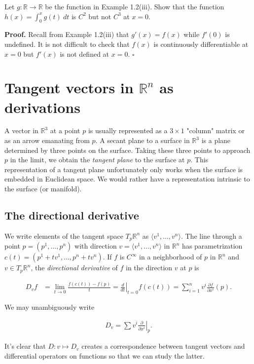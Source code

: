 \documentclass[a4paper]{article}
\newcommand{\R}{\mathbb{R}}
\begin{document}
Let $g : \R \to \R$ be the function in Example 1.2(iii). Show that the function $h(x) = \int_0^x g(t)\ dt$ is $C^2$ but not $C^3$ at $x = 0$.

\textbf{Proof.} Recall from Example 1.2(iii) that $g'(x) = f(x)$ while $f'(0)$ is undefined. It is not difficult to check that $f(x)$ is continuously differentiable at $x = 0$ but $f'(x)$ is not defined at $x = 0$. $\square$

\section{Tangent vectors in $\R^n$ as derivations}

A vector in $\R^3$ at a point $p$ is usually represented as a $3\times1$ "column" matrix or as an arrow emanating from $p$. A secant plane to a surface in $\R^3$ is a plane determined by three points on the surface. Taking these three points to approach $p$ in the limit, we obtain the \emph{tangent plane} to the surface at $p$. This representation of a tangent plane unfortunately only works when the surface is embedded in Euclidean space. We would rather have a representation intrinsic to the surface (or manifold).

\subsection{The directional derivative}

We write elements of the tangent space $T_p\R^n$ as $\langle v^1, \ldots, v^n \rangle$. The line through a point $p = (p^1, \ldots, p^n)$ with direction $v = \langle v^1, \ldots, v^n \rangle$ in $\R^n$ has parametrization $c(t) = (p^1 + tv^1, \ldots, p^n + tv^n)$. If $f$ is $C^\infty$ in a neighborhood of $p$ in $\R^n$ and $v \in T_p\R^n$, the \emph{directional derivative} of $f$ in the direction $v$ at $p$ is 

\begin{align}
    \displaystyle D_vf &= \lim_{t \to 0} \frac{f(c(t)) - f(p)}{t} = \left.\frac{d}{dt}\right|_{t=0} f(c(t)) = \sum_{i=1}^n v^i \frac{\partial f}{\partial x^i}(p).
\end{align}

We may unambiguously write

\begin{align}
    D_v = \sum v^i \left.\frac{\partial}{\partial x^i}\right|_p.
\end{align}

It's clear that $D : v \mapsto D_v$ creates a correspondence between tangent vectors and differential operators on functions so that we can study the latter.
\end{document}
